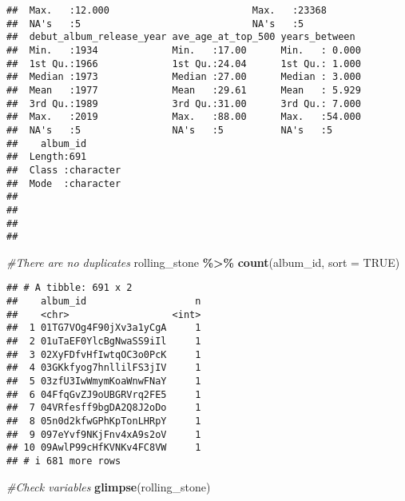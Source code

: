 \documentclass[
]{article}
\newenvironment{Shaded}{\begin{snugshade}}{\end{snugshade}}
\newcommand{\AttributeTok}[1]{\textcolor[rgb]{0.13,0.29,0.53}{#1}}
\newcommand{\CommentTok}[1]{\textcolor[rgb]{0.56,0.35,0.01}{\textit{#1}}}
\newcommand{\ConstantTok}[1]{\textcolor[rgb]{0.56,0.35,0.01}{#1}}
\newcommand{\FunctionTok}[1]{\textcolor[rgb]{0.13,0.29,0.53}{\textbf{#1}}}
\newcommand{\NormalTok}[1]{#1}
\newcommand{\SpecialCharTok}[1]{\textcolor[rgb]{0.81,0.36,0.00}{\textbf{#1}}}
\begin{document}
\begin{verbatim}
##  Max.   :12.000                         Max.   :23368        
##  NA's   :5                              NA's   :5            
##  debut_album_release_year ave_age_at_top_500 years_between   
##  Min.   :1934             Min.   :17.00      Min.   : 0.000  
##  1st Qu.:1966             1st Qu.:24.04      1st Qu.: 1.000  
##  Median :1973             Median :27.00      Median : 3.000  
##  Mean   :1977             Mean   :29.61      Mean   : 5.929  
##  3rd Qu.:1989             3rd Qu.:31.00      3rd Qu.: 7.000  
##  Max.   :2019             Max.   :88.00      Max.   :54.000  
##  NA's   :5                NA's   :5          NA's   :5       
##    album_id        
##  Length:691        
##  Class :character  
##  Mode  :character  
##                    
##                    
##                    
## 
\end{verbatim}

\begin{Shaded}
\begin{Highlighting}[]
\CommentTok{\#There are no duplicates}
\NormalTok{rolling\_stone }\SpecialCharTok{\%\textgreater{}\%}
  \FunctionTok{count}\NormalTok{(album\_id, }\AttributeTok{sort =} \ConstantTok{TRUE}\NormalTok{)}
\end{Highlighting}
\end{Shaded}

\begin{verbatim}
## # A tibble: 691 x 2
##    album_id                   n
##    <chr>                  <int>
##  1 01TG7VOg4F90jXv3a1yCgA     1
##  2 01uTaEF0YlcBgNwaSS9iIl     1
##  3 02XyFDfvHfIwtqOC3o0PcK     1
##  4 03GKkfyog7hnllilFS3jIV     1
##  5 03zfU3IwWmymKoaWnwFNaY     1
##  6 04FfqGvZJ9oUBGRVrq2FE5     1
##  7 04VRfesff9bgDA2Q8J2oDo     1
##  8 05n0d2kfwGPhKpTonLHRpY     1
##  9 097eYvf9NKjFnv4xA9s2oV     1
## 10 09AwlP99cHfKVNKv4FC8VW     1
## # i 681 more rows
\end{verbatim}

\begin{Shaded}
\begin{Highlighting}[]
\CommentTok{\#Check variables}
\FunctionTok{glimpse}\NormalTok{(rolling\_stone)}
\end{Highlighting}
\end{Shaded}
\end{document}
